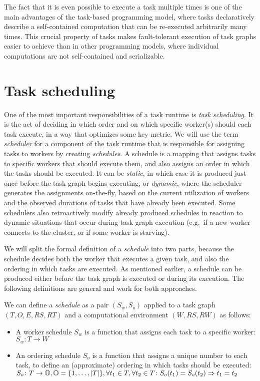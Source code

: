 The fact that it is even possible to execute a task multiple times is one of the main advantages of
the task-based programming model, where tasks declaratively describe a self-contained computation
that can be re-executed arbitrarily many times. This crucial property of tasks makes fault-tolerant
execution of task graphs easier to achieve than in other programming models, where individual
computations are not self-contained and serializable.

\section{Task scheduling}
\label{sec:task-scheduling}
One of the most important responsibilities of a task runtime is \emph{task scheduling}. It is the
act of deciding in which order and on which specific worker(s) should each task execute, in a way
that optimizes some key metric. We will use the term \emph{scheduler} for a component of the
task runtime that is responsible for assigning tasks to workers by creating \emph{schedules}.
A schedule is a mapping that assigns tasks to specific workers that should execute them, and also
assigns an order in which the tasks should be executed. It can be \emph{static}, in which
case it is produced just once before the task graph begins executing, or \emph{dynamic},
where the scheduler generates the assignments on-the-fly, based on the current utilization of
workers and the observed durations of tasks that have already been executed. Some schedulers also
retroactively modify already produced schedules in reaction to dynamic situations that occur during
task graph execution (e.g.\ if a new worker connects to the cluster, or if some worker is
starving).

We will split the formal definition of a \emph{schedule} into two parts, because the
schedule decides both the worker that executes a given task, and also the ordering in which tasks
are executed. As mentioned earlier, a schedule can be produced either before the task graph is
executed or during its execution. The following definitions are general and work for both
approaches.

We can define a \emph{schedule} as a pair $(S_w, S_o)$ applied to a task graph
$(T, O, E, RS, RT)$ and a computational environment $(W, RS, RW)$ as follows:

\begin{itemize}[itemsep=0pt]
	\item A worker schedule $S_w$ is a function that assigns each task to a specific worker:
	      \\ $S_w\colon T \rightarrow W$
	\item An ordering schedule $S_o$ is a function that assigns a unique number to each
	      task, to define an (approximate) ordering in which tasks should be executed: \\
	      $S_o\colon T \rightarrow \mathbb{O}, \mathbb{O} = \{1,\ldots,|T|\},
		      \forall t_1\in{}T, \forall t_2\in{}T\colon S_o(t_1) = S_o(t_2) \Rightarrow t_1 = t_2$
\end{itemize}

